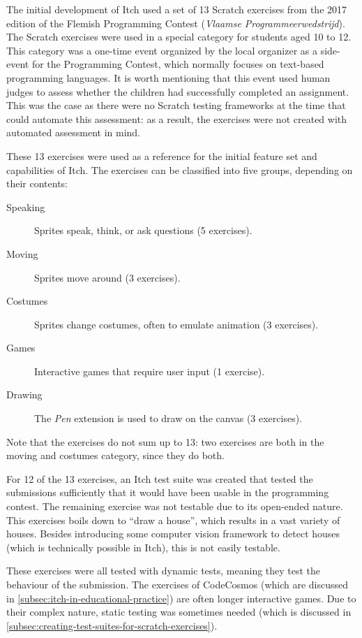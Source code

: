 \documentclass[../main]{subfiles}
\begin{document}
The initial development of Itch used a set of 13 Scratch exercises from the 2017 edition of the Flemish Programming Contest (\textdutch{\emph{Vlaamse Programmeerwedstrijd}}).
The Scratch exercises were used in a special category for students aged 10 to 12.
This category was a one-time event organized by the local organizer as a side-event for the Programming Contest, which normally focuses on text-based programming languages.
It is worth mentioning that this event used human judges to assess whether the children had successfully completed an assignment.
This was the case as there were no Scratch testing frameworks at the time that could automate this assessment: as a result, the exercises were not created with automated assessment in mind.

These 13 exercises were used as a reference for the initial feature set and capabilities of Itch.
The exercises can be classified into five groups, depending on their contents:

\begin{description}
    \item[Speaking] Sprites speak, think, or ask questions (5 exercises).
    \item[Moving] Sprites move around (3 exercises).
    \item[Costumes] Sprites change costumes, often to emulate animation (3 exercises).
    \item[Games] Interactive games that require user input (1 exercise).
    \item[Drawing] The \emph{Pen} extension is used to draw on the canvas (3 exercises).
\end{description}

Note that the exercises do not sum up to 13: two exercises are both in the moving and costumes category, since they do both.

For 12 of the 13 exercises, an Itch test suite was created that tested the submissions sufficiently that it would have been usable in the programming contest.
The remaining exercise was not testable due to its open-ended nature.
This exercises boils down to ``draw a house'', which results in a vast variety of houses.
Besides introducing some computer vision framework to detect houses (which is technically possible in Itch), this is not easily testable.

These exercises were all tested with dynamic tests, meaning they test the behaviour of the submission.
The exercises of CodeCosmos (which are discussed in \cref{subsec:itch-in-educational-practice}) are often longer interactive games.
Due to their complex nature, static testing was sometimes needed (which is discussed in \cref{subsec:creating-test-suites-for-scratch-exercises}).
\end{document}
